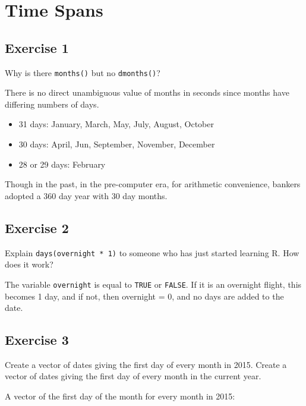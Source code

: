 \documentclass[]{book}
\providecommand{\tightlist}{%
  \setlength{\itemsep}{0pt}\setlength{\parskip}{0pt}}
\theoremstyle{definition}
\theoremstyle{definition}
\theoremstyle{definition}
\theoremstyle{remark}
\begin{document}
\hypertarget{time-spans}{%
\section{Time Spans}\label{time-spans}}

\hypertarget{exercise-1-43}{%
\subsection{Exercise 1}\label{exercise-1-43}}

Why is there \texttt{months()} but no \texttt{dmonths()}?

There is no direct unambiguous value of months in seconds since months
have differing numbers of days.

\begin{itemize}
\tightlist
\item
  31 days: January, March, May, July, August, October
\item
  30 days: April, Jun, September, November, December
\item
  28 or 29 days: February
\end{itemize}

Though in the past, in the pre-computer era, for arithmetic convenience,
bankers adopted a 360 day year with 30 day months.

\hypertarget{exercise-2-42}{%
\subsection{Exercise 2}\label{exercise-2-42}}

Explain \texttt{days(overnight\ *\ 1)} to someone who has just started
learning R. How does it work?

The variable \texttt{overnight} is equal to \texttt{TRUE} or
\texttt{FALSE}. If it is an overnight flight, this becomes 1 day, and if
not, then overnight = 0, and no days are added to the date.

\hypertarget{exercise-3-30}{%
\subsection{Exercise 3}\label{exercise-3-30}}

Create a vector of dates giving the first day of every month in 2015.
Create a vector of dates giving the first day of every month in the
current year.

A vector of the first day of the month for every month in 2015:
\end{document}
